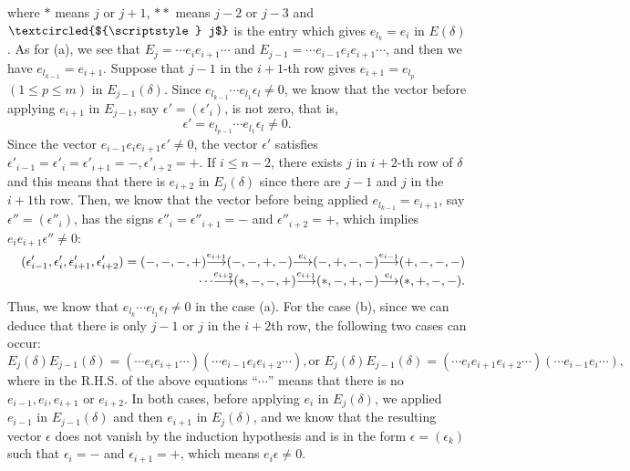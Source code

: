 where $*$ means $j$ or $j+1$, $**$ means $j-2$ or $j-3$ and 
$\textcircled{${\scriptstyle} j$}$ is the entry which gives $e_{l_k}=e_i$ 
in $E({\delta})$.
As for (a), we see that $E_j={\cdots} e_ie_{i+1}{\cdots}$ and 
$E_{j-1}={\cdots} e_{i-1}e_ie_{i+1}{\cdots}$, and then
 we have $e_{l_{k-1}}=e_{i+1}$.
Suppose that $j-1$ in the $i+1$-th row 
gives $e_{i+1}=e_{l_p}$ $(1\leq p\leq m)$ in $E_{j-1}({\delta})$. 
Since $e_{l_{k-1}}{\cdots} e_{l_1}{\epsilon}_l\ne0$, we know that 
the vector before applying $e_{i+1}$ in $E_{j-1}$, say ${\epsilon}'=({\epsilon}'_i)$, 
is not zero, that is, 
\[
 {\epsilon}'=e_{l_{p-1}}{\cdots} e_{l_1}{\epsilon}_l\ne0.
\]
Since the vector $e_{i-1}e_ie_{i+1}{\epsilon}'\ne0$, 
the vector ${\epsilon}'$ satisfies ${\epsilon}'_{i-1}={\epsilon}'_i={\epsilon}'_{i+1}=-,{\epsilon}'_{i+2}=+$. 
If $i\leq n-2$, there exists $j$ in $i+2$-th row of ${\delta}$ 
and this means that there is $e_{i+2}$ in $E_j({\delta})$ since 
there are $j-1$ and $j$ in the $i+1$th row. Then, 
we know that the vector before being applied $e_{l_{k-1}}=e_{i+1}$, say 
${\epsilon}''=({\epsilon}''_i)$, has the signs ${\epsilon}''_i={\epsilon}''_{i+1}=-$ 
and ${\epsilon}''_{i+2}=+$, which implies $e_ie_{i+1}{\epsilon}''\ne0$:
\begin{eqnarray*}
&& ({\epsilon}'_{i-1},{\epsilon}'_i,{\epsilon}'_{i+1},{\epsilon}'_{i+2})=(-,-,-,+){\smash{\mathop{\longrightarrow}\limits^{{e_{i+1}}}}}
(-,-,+,-){\smash{\mathop{\longrightarrow}\limits^{{e_i}}}}(-,+,-,-){\smash{\mathop{\longrightarrow}\limits^{{e_{i-1}}}}}
(+,-,-,-)\\
&&{\cdots} {\smash{\mathop{\longrightarrow}\limits^{{e_{i+2}}}}}(*,-,-,+){\smash{\mathop{\longrightarrow}\limits^{{e_{i+1}}}}}
(*,-,+,-){\smash{\mathop{\longrightarrow}\limits^{{e_i}}}}(*,+,-,-).
\end{eqnarray*}
Thus, we know that $e_{l_k}{\cdots} e_{l_1}{\epsilon}_l\ne 0$ in the case (a). 
For the case (b), since we can deduce that there is only $j-1$ or $j$ 
in the $i+2$th row, the following two cases can occur:
\[
 E_{j}({\delta})E_{j-1}({\delta})
=({\cdots} e_ie_{i+1}{\cdots})({\cdots} e_{i-1}e_ie_{i+2}{\cdots}), \text{or }
 E_{j}({\delta})E_{j-1}({\delta})
=({\cdots} e_ie_{i+1}e_{i+2}{\cdots})({\cdots} e_{i-1}e_i{\cdots}),
\]
where in the R.H.S. of the above equations 
``${\cdots}$'' means that there is no
$e_{i-1},e_{i},e_{i+1}$ or $e_{i+2}$.
In both cases, before applying $e_i$ in $E_j({\delta})$, we applied 
$e_{i-1}$ in $E_{j-1}({\delta})$ and then $e_{i+1}$ in $E_j({\delta})$, 
and we know that 
the resulting vector ${\epsilon}$
does not vanish by the induction hypothesis and is in
the form ${\epsilon}=({\epsilon}_k)$ such that ${\epsilon}_i=-$ and ${\epsilon}_{i+1}=+$, which
means  $e_i{\epsilon}\ne0$.

